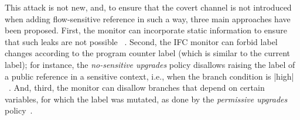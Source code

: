 
This attack is not new, and, to ensure that the covert channel is
not introduced when adding flow-sensitive reference in such a way,
three main approaches have been proposed.  First, the monitor can
incorporate static information to ensure that such leaks are not
possible~\cite{Russo:2010,stefan:lio,Breeze} .  Second, the IFC monitor can
forbid label changes according to the program counter label (which is
similar to the current label); for instance, the \emph{no-sensitive
upgrades} policy disallows raising the label of a public reference in
a sensitive context, i.e., when the branch condition is
|high|~\cite{Zdancewic02programminglanguages,Austin:Flanagan:PLAS09}.
And, third, the monitor can disallow branches that depend on certain
variables, for which the label was mutated, as done by the
\emph{permissive upgrades} policy~\cite{Austin:Flanagan:PLAS10}.


